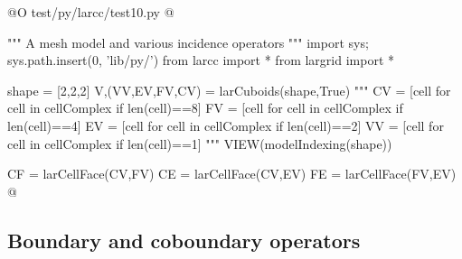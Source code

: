 \documentclass[11pt,oneside]{article}	%
\begin{document}
@O test/py/larcc/test10.py
@{""" A mesh model and various incidence operators """
import sys; sys.path.insert(0, 'lib/py/')
from larcc import *
from largrid import *

shape = [2,2,2]
V,(VV,EV,FV,CV) = larCuboids(shape,True)
"""
CV = [cell for cell in cellComplex if len(cell)==8]
FV = [cell for cell in cellComplex if len(cell)==4]
EV = [cell for cell in cellComplex if len(cell)==2]
VV = [cell for cell in cellComplex if len(cell)==1]
"""
VIEW(modelIndexing(shape))

CF = larCellFace(CV,FV)
CE = larCellFace(CV,EV)
FE = larCellFace(FV,EV)
@}




\subsection{Boundary and coboundary operators}
\end{document}
